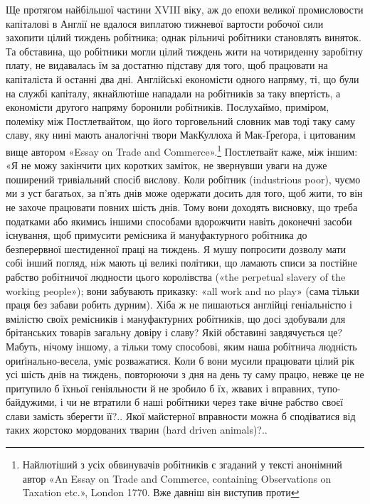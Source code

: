 Ще протягом найбільшої частини XVIII віку, аж до епохи
великої промисловости капіталові в Англії не вдалося виплатою
тижневої вартости робочої сили захопити цілий тиждень робітника;
однак рільничі робітники становлять виняток. Та обставина,
що робітники могли цілий тиждень жити на чотириденну
заробітну плату, не видавалась їм за достатню підставу для того,
щоб працювати на капіталіста й останні два дні. Англійські економісти
одного напряму, ті, що були на службі капіталу, якнайлютіше
нападали на робітників за таку впертість, а економісти
другого напряму боронили робітників. Послухаймо, приміром,
полеміку між Постлетвайтом, що його торговельний словник
мав тоді таку саму славу, яку нині мають аналогічні твори МакКуллоха
й Мак-Ґреґора, і цитованим вище автором «Essay
on Trade and Commerce».\footnote{
Найлютіший з усіх обвинувачів робітників є згаданий у тексті
анонімний автор «An Essay on Trade and Commerce, containing Observations
on Taxation etc.», London 1770. Вже давніш він виступив проти
}
Постлетвайт каже, між іншим: «Я не можу закінчити цих
коротких заміток, не звернувши уваги на дуже поширений тривіальний
спосіб вислову. Коли робітник (industrious poor), чуємо
ми з уст багатьох, за п’ять днів може одержати досить для того,
щоб жити, то він не захоче працювати повних шість днів. Тому
вони доходять висновку, що треба податками або якимись іншими
способами вдорожчити навіть доконечні засоби існування, щоб
примусити ремісника й мануфактурного робітника до безперервної
шестиденної праці на тиждень. Я мушу попросити дозволу мати
собі інший погляд, ніж мають ці великі політики, що ламають
списи за постійне рабство робітничої людности цього королівства
(«the perpetual slavery of the working people»); вони забувають
приказку: «all work and no play» (сама тільки праця без
забави робить дурним). Хіба ж не пишаються англійці геніальністю
і вмілістю своїх ремісників і мануфактурних робітників,
що досі здобували для брітанських товарів загальну довіру і
славу? Якій обставині завдячується це? Мабуть, нічому іншому,
а тільки тому способові, яким наша робітнича людність ориґінально-весела,
уміє розважатися. Коли б вони мусили працювати
цілий рік усі шість днів на тиждень, повторюючи з дня на день
ту саму працю, невже це не притупило б їхньої геніяльности й не
зробило б їх, жвавих і вправних, тупо-байдужими, і чи не втратили
б наші робітники через таке вічне рабство своєї слави замість
зберегти її?.. Якої майстерної вправности можна б сподіватися
від таких жорстоко мордованих тварин (hard driven animals)?..
